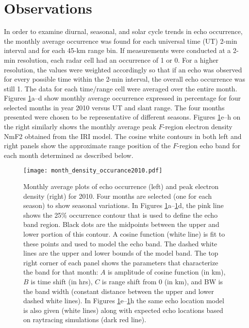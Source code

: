 \section{Observations}
\label{Sec:Obs}

In order to examine diurnal, seasonal, and solar cycle trends in echo occurrence, the monthly average occurrence was found for each universal time (UT) 2-min interval and for each 45-km range bin. If measurements were conducted at a 2-min resolution, each radar cell had an occurrence of 1 or 0. For a higher resolution, the values were weighted accordingly so that if an echo was observed for every possible time within the 2-min interval, the overall echo occurrence was still 1. The data for each time/range cell were averaged over the entire month. Figures \ref{fig:month_avg_occ}a--d show monthly average occurrence expressed in percentage for four selected months in year 2010 versus UT and slant range. The four months presented were chosen to be representative of different seasons. Figures \ref{fig:month_avg_occ}e--h on the right similarly shows the monthly average peak \(F\)-region electron density NmF2 obtained from the IRI model. The cosine white contours in both left and right panels show the approximate range position of the \(F\)-region echo band for each month determined as described below.
	
\begin{figure}
\texttt{[image: month\_density\_occurance2010.pdf]}
\caption{Monthly average plots of echo occurrence (left) and peak electron density (right) for 2010.  Four months are selected (one for each season) to show seasonal variations. In Figures \ref{fig:month_avg_occ}a--\ref{fig:month_avg_occ}d,  the pink line shows the 25\% occurrence contour that is used to define the echo band region. Black dots are the midpoints between the upper and lower portion of this contour.  A cosine function (white line) is fit to these points and used to model the echo band. The dashed white lines are the upper and lower bounds of the model band. The top right corner of each panel shows the parameters that characterize the band for that month: \(A\) is amplitude of cosine function (in km), \(B\) is time shift (in hrs), \(C\) is range shift from 0 (in km), and BW is the band width (constant distance between the upper and lower dashed white lines).  In Figures \ref{fig:month_avg_occ}e--\ref{fig:month_avg_occ}h the same echo location model is also given (white lines) along with expected echo locations based on raytracing simulations (dark red line).}
\label{fig:month_avg_occ}
\end{figure}

